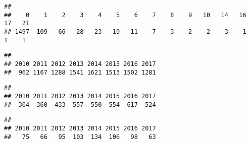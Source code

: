 \documentclass[]{article}
\newenvironment{Shaded}{\begin{snugshade}}{\end{snugshade}}
\newcommand{\KeywordTok}[1]{\textcolor[rgb]{0.13,0.29,0.53}{\textbf{#1}}}
\newcommand{\CommentTok}[1]{\textcolor[rgb]{0.56,0.35,0.01}{\textit{#1}}}
\newcommand{\ControlFlowTok}[1]{\textcolor[rgb]{0.13,0.29,0.53}{\textbf{#1}}}
\newcommand{\OperatorTok}[1]{\textcolor[rgb]{0.81,0.36,0.00}{\textbf{#1}}}
\newcommand{\NormalTok}[1]{#1}
\begin{document}
\begin{verbatim}
## 
##    0    1    2    3    4    5    6    7    8    9   10   14   16   17   21 
## 1497  109   66   28   23   10   11    7    3    2    2    3    1    1    1
\end{verbatim}

\begin{Shaded}
\end{Shaded}

\begin{verbatim}
## 
## 2010 2011 2012 2013 2014 2015 2016 2017 
##  962 1167 1288 1541 1621 1513 1502 1281
\end{verbatim}

\begin{Shaded}
\end{Shaded}

\begin{verbatim}
## 
## 2010 2011 2012 2013 2014 2015 2016 2017 
##  304  360  433  557  550  554  617  524
\end{verbatim}

\begin{Shaded}
\end{Shaded}

\begin{verbatim}
## 
## 2010 2011 2012 2013 2014 2015 2016 2017 
##   75   66   95  103  134  106   98   63
\end{verbatim}
\end{document}
